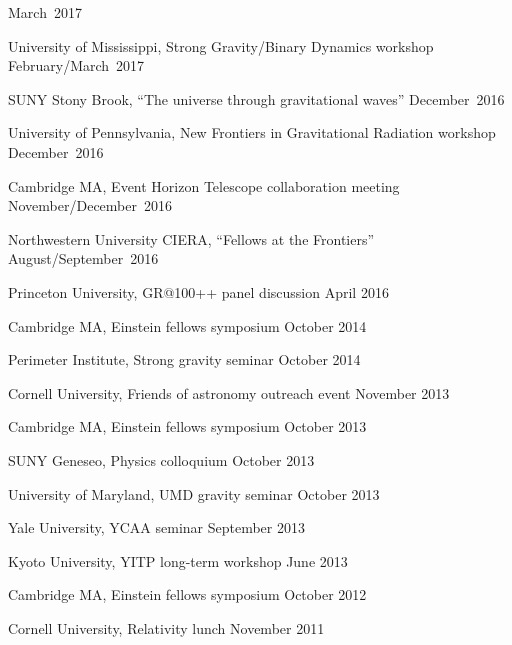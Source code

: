 \begin{etaremune}
  \hfill{}
  March~2017
\item
  University of Mississippi,
  Strong Gravity/Binary Dynamics workshop
  \hfill{}
  February/March~2017
\item
  SUNY Stony Brook,
  ``The universe through gravitational waves''
  \hfill{}
  December~2016
\item
  University of Pennsylvania,
  New Frontiers in Gravitational Radiation workshop
  \hfill{}
  December~2016
\item
  Cambridge MA,
  Event Horizon Telescope collaboration meeting
  \hfill{}
  November/December~2016
\item
  Northwestern University CIERA,
  ``Fellows at the Frontiers''
  \hfill{}
  August/September~2016
\item
  Princeton University,
  GR@100++ panel discussion
  \hfill{}
  April 2016
\item
  Cambridge MA,
  Einstein fellows symposium
  \hfill{}
  October 2014
\item
  Perimeter Institute,
  Strong gravity seminar
  \hfill{}
  October 2014
\item
  Cornell University,
  Friends of astronomy outreach event
  \hfill{}
  November 2013
\item
  Cambridge MA,
  Einstein fellows symposium
  \hfill{}
  October 2013
\item
  SUNY Geneseo,
  Physics colloquium
  \hfill{}
  October 2013
\item
  University of Maryland,
  UMD gravity seminar
  \hfill{}
  October 2013
\item
  Yale University,
  YCAA seminar
  \hfill{}
  September 2013
\item
  Kyoto University,
  YITP long-term workshop
  \hfill{}
  June 2013
\item
  Cambridge MA,
  Einstein fellows symposium
  \hfill{}
  October 2012
\item
  Cornell University,
  Relativity lunch
  \hfill{}
  November 2011
\end{etaremune}

